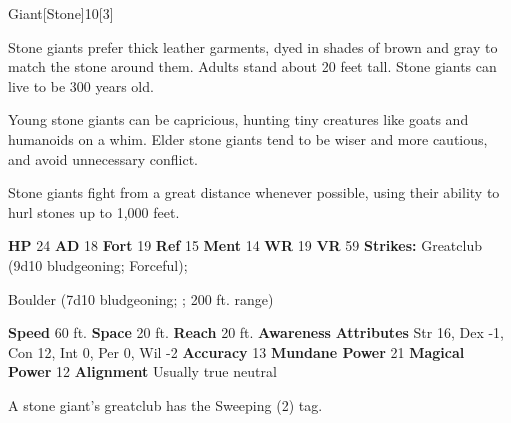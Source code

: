   \begin{monsection}{Giant}[Stone]{10}[3]
    \vspace{-1em}\vspace{-1em}
    \vspace{0em}

    
      Stone giants prefer thick leather garments, dyed in shades of brown and gray to match the stone around them. Adults stand about 20 feet tall. Stone giants can live to be 300 years old.

      Young stone giants can be capricious, hunting tiny creatures like goats and humanoids on a whim.
      Elder stone giants tend to be wiser and more cautious, and avoid unnecessary conflict.
    
      Stone giants fight from a great distance whenever possible, using their ability to hurl stones up to 1,000 feet.
    

    \begin{spellcontent}
      \begin{spelltargetinginfo}
        \pari \textbf{HP} 24 \monsep
          \textbf{AD} 18 \monsep
          \textbf{Fort} 19 \monsep
          \textbf{Ref} 15 \monsep
          \textbf{Ment} 14
        \pari \textbf{WR} 19 \monsep
        \textbf{VR} 59
        \pari \textbf{Strikes:}
            Greatclub  (9d10 bludgeoning; Forceful);
\par Boulder  (7d10 bludgeoning; ; 200 ft. range)
      \end{spelltargetinginfo}
    \end{spellcontent}
    \begin{monsterfooter}
      \pari \textbf{Speed} 60 ft. \monsep
        \textbf{Space} 20 ft. \monsep
        \textbf{Reach} 20 ft.
      \pari \textbf{Awareness} 
      \pari \textbf{Attributes}
        Str 16, Dex -1,
        Con 12, Int 0,
        Per 0, Wil -2
      \pari \textbf{Accuracy} 13 \monsep
        \textbf{Mundane Power} 21 \monsep
      \textbf{Magical Power} 12
      \pari \textbf{Alignment} Usually true neutral
    \end{monsterfooter}
  \end{monsection}
   A stone giant's greatclub has the Sweeping (2) tag.
  
